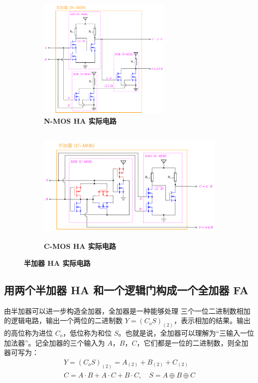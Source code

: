 \documentclass[UTF8]{report}
\theoremstyle{MyLineTheoremStyle} %
\theoremstyle{MyBlockTheoremStyle} %
\theoremstyle{MySubsubsectionStyle} %
\begin{document}
\begin{figure}[H]\centering
\begin{subfigure}[t]{0.42\columnwidth}\centering
    \includegraphics[height=165pt]{assets/5/NMOS 半加器实际电路.pdf}
    \caption{\bfseries N-MOS HA 实际电路 }
\end{subfigure}\hfill
\begin{subfigure}[t]{0.58\columnwidth}\centering
    \includegraphics[height=160pt]{assets/5/CMOS 半加器实际电路.pdf}
    \caption{\bfseries C-MOS HA 实际电路 }
\end{subfigure}
\caption{\bfseries 半加器 HA 实际电路 }\label{半加器 HA 实际电路}
\end{figure}

\subsection{用两个半加器 HA 和一个逻辑门构成一个全加器 FA}

由半加器可以进一步构造全加器，全加器是一种能够处理{\color{red} 三个一位二进制数}相加的逻辑电路，输出一个两位的二进制数 $Y= (C_o S)_{(2)}$，表示相加的结果。输出的高位称为进位 $C_o$，低位称为和位 $S$。也就是说，全加器可以理解为“三输入一位加法器”。记全加器的三个输入为 $A$，$B$，$C$，它们都是一位的二进制数，则全加器可写为：
\begin{gather}
Y= (C_oS)_{(2)} = A_{(2)} + B_{(2)} + C_{(2)} 
\\ 
C = A \cdot B + A \cdot C + B \cdot C,\quad 
S = A \oplus B \oplus C
\end{gather}
\end{document}
